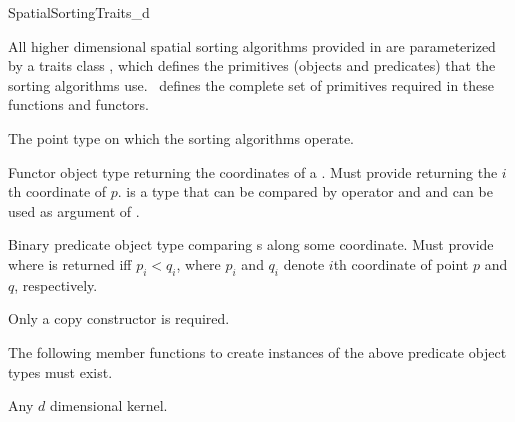 

\begin{ccRefConcept}{SpatialSortingTraits_d}

\ccDefinition
  
All higher dimensional spatial sorting algorithms provided in \cgal{} are parameterized
by a traits class , which defines the
primitives (objects and predicates) that the sorting algorithms use.
\ccRefName\ defines the complete set of primitives required in these
functions and functors.

\ccTypes
\ccAutoIndexingOff
{}

%
       {The point type on which the sorting algorithms operate.
       }


%
       {Functor object type returning the coordinates of a  .
       Must provide 
          returning the $i$th
        coordinate of $p$.  is a type that can be compared by
        operator  \ccc{<} and \ccc{<=} and can be used as
        argument of .
       }


%
       {Binary predicate object type comparing s
        along some coordinate.
        Must provide 
         where 
        is returned iff $p_i < q_i$,
        where $p_i$ and $q_i$ denote $i$th coordinate of point $p$ and $q$,
        respectively.
       }

\ccCreation
{}  %

Only a copy constructor is required.


\ccOperations

The following member functions to create instances of the above predicate
object types must exist. 

\setlength\parskip{0mm}

\ccParDims
\ccHasModels

Any \cgal{} $d$ dimensional kernel.

\ccParDims
\end{ccRefConcept}



